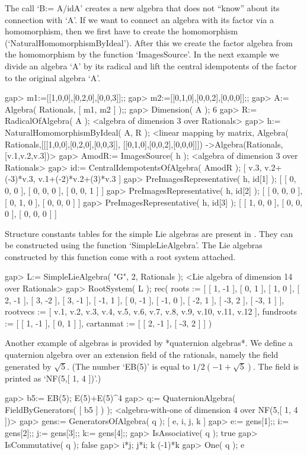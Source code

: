 The call `B:= A/idA' creates a new algebra that does not ``know'' about
its connection with `A'. If we want to connect an algebra with its factor
via a homomorphism, then we first have to create the homomorphism
(`NaturalHomomorphismByIdeal'). After this we create the factor algebra 
from the homomorphism by the function `ImagesSource'. In the next example
we divide an algebra `A' by its radical and lift the central idempotents
of the factor to the original algebra `A'.

\beginexample
gap> m1:=[[1,0,0],[0,2,0],[0,0,3]];;
gap> m2:=[[0,1,0],[0,0,2],[0,0,0]];;
gap> A:= Algebra( Rationals, [ m1, m2 ] );;
gap> Dimension( A );
6
\endexample
\beginexample
gap> R:= RadicalOfAlgebra( A );
<algebra of dimension 3 over Rationals>
gap> h:= NaturalHomomorphismByIdeal( A, R );
<linear mapping by matrix, 
  Algebra( Rationals,[[[1,0,0],[0,2,0],[0,0,3]], [[0,1,0],[0,0,2],[0,0,0]]])
  ->Algebra(Rationals,[v.1,v.2,v.3])>
\endexample
\beginexample
gap> AmodR:= ImagesSource( h );
<algebra of dimension 3 over Rationals>
gap> id:= CentralIdempotentsOfAlgebra( AmodR );
[ v.3, v.2+(-3)*v.3, v.1+(-2)*v.2+(3)*v.3 ]
gap> PreImagesRepresentative( h, id[1] );
[ [ 0, 0, 0 ], [ 0, 0, 0 ], [ 0, 0, 1 ] ]
gap> PreImagesRepresentative( h, id[2] );
[ [ 0, 0, 0 ], [ 0, 1, 0 ], [ 0, 0, 0 ] ]
gap> PreImagesRepresentative( h, id[3] );
[ [ 1, 0, 0 ], [ 0, 0, 0 ], [ 0, 0, 0 ] ]
\endexample

Structure constants tables for the simple Lie algebras are present in {\GAP}.
They can be constructed using the function `SimpleLieAlgebra'. The Lie 
algebras constructed by this function come with a root system attached.

\beginexample
gap> L:= SimpleLieAlgebra( "G", 2, Rationals );
<Lie algebra of dimension 14 over Rationals>
gap> RootSystem( L );
rec(
  roots := [ [ 1, -1 ], [ 0, 1 ], [ 1, 0 ], [ 2, -1 ], [ 3, -2 ], [ 3, -1 ], 
      [ -1, 1 ], [ 0, -1 ], [ -1, 0 ], [ -2, 1 ], [ -3, 2 ], [ -3, 1 ] ],
  rootvecs := [ v.1, v.2, v.3, v.4, v.5, v.6, v.7, v.8, v.9, v.10, v.11, v.12 
     ],
  fundroots := [ [ 1, -1 ], [ 0, 1 ] ],
  cartanmat := [ [ 2, -1 ], [ -3, 2 ] ] )
\endexample

Another example of algebras is provided by *quaternion algebras*.
We define a quaternion algebra over an extension field of the
rationals, namely the field generated by $\sqrt{5}$.
(The number `EB(5)' is equal to $1/2 (-1+\sqrt{5})$.
The field is printed as `NF(5,[ 1, 4 ])'.)

\beginexample
gap> b5:= EB(5);
E(5)+E(5)^4
gap> q:= QuaternionAlgebra( FieldByGenerators( [ b5 ] ) );
<algebra-with-one of dimension 4 over NF(5,[ 1, 4 ])>
gap> gens:= GeneratorsOfAlgebra( q );
[ e, i, j, k ]
gap> e:= gens[1];; i:= gens[2];; j:= gens[3];; k:= gens[4];;
gap> IsAssociative( q );
true
gap> IsCommutative( q );
false
gap> i*j; j*i;
k
(-1)*k
gap> One( q );
e
\endexample

